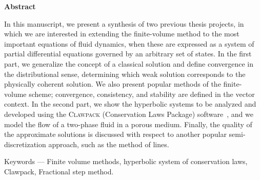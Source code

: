 \newpage
\begin{center}
	\fontsize{14}{17}\selectfont\bfseries Abstract
\end{center}
\noindent In this manuscript, we present a synthesis of two previous thesis
projects, in which we are interested in extending the finite-volume
method to the most important equations of fluid dynamics, when these
are expressed as a system of partial differential equations governed
by an arbitrary set of states.
In the first part, we generalize the concept of a classical solution
and define convergence in the distributional sense, determining which
weak solution corresponds to the physically coherent solution.
We also present popular methods of the finite-volume scheme;
convergence, consistency, and stability are defined in the vector
context.
In the second part, we show the hyperbolic systems to be analyzed and
developed using the \textsc{Clawpack} (Conservation Laws Package)
software~\cite{Clawpack2025,Mandli2016}, and we model the flow of a
two-phase fluid in a porous medium.
Finally, the quality of the approximate solutions is discussed with
respect to another popular semi-discretization approach, such as the
method of lines.

\noindent Keywords --- Finite volume methods, hyperbolic system of
conservation laws, Clawpack, Fractional step method.

